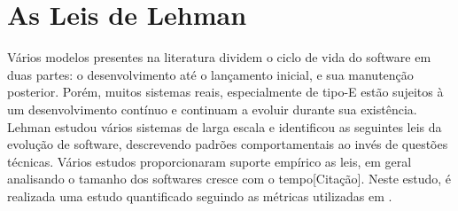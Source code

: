 \section{As Leis de Lehman}

Vários modelos presentes na literatura dividem o ciclo de vida do software em duas partes: o desenvolvimento até o lançamento inicial, e sua manutenção posterior. Porém, muitos sistemas reais, especialmente de tipo-E estão sujeitos à um desenvolvimento contínuo e continuam a evoluir durante sua existência. 
Lehman estudou vários sistemas de larga escala e identificou as seguintes leis da evolução de software, descrevendo padrões comportamentais ao invés de questões técnicas\cite{lehman1979understanding,lehman1996laws}. Vários estudos proporcionaram suporte empírico as leis, em geral analisando o tamanho dos softwares cresce com o tempo[Citação]. Neste estudo, é realizada uma estudo quantificado seguindo as métricas utilizadas em \cite{israeli2010linux}.

